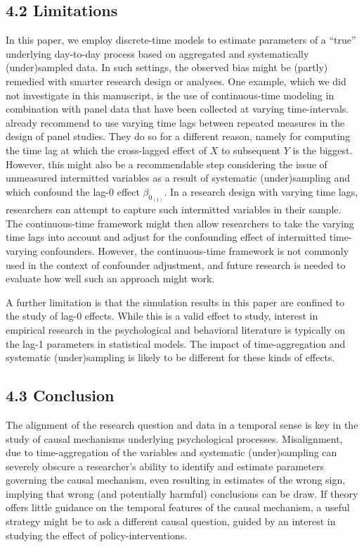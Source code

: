 \documentclass[man]{apa7} %
\begin{document}
\subsection{4.2 Limitations}
In this paper, we employ discrete-time models to estimate parameters of a ``true'' underlying day-to-day process based on aggregated and systematically (under)sampled data. In such settings, the observed bias might be (partly) remedied with smarter research design or analyses. One example, which we did not investigate in this manuscript, is the use of continuous-time modeling in combination with panel data that have been collected at varying time-intervals. \textcite{dormann_optimal_2015} already recommend to use varying time lags between repeated measures in the design of panel studies. They do so for a different reason, namely for computing the time lag at which the cross-lagged effect of $X$ to subsequent $Y$ is the biggest. However, this might also be a recommendable step considering the issue of unmeasured intermitted variables as a result of systematic (under)sampling and which confound the lag-0 effect $\beta_{0_{(1)}}$. In a research design with varying time lags, researchers can attempt to capture such intermitted variables in their sample. The continuous-time framework might then allow researchers to take the varying time lags into account and adjust for the confounding effect of intermitted time-varying confounders. However, the continuous-time framework is not commonly used in the context of confounder adjustment, and future research is needed to evaluate how well such an approach might work. 

A further limitation is that the simulation results in this paper are confined to the study of lag-0 effects. While this is a valid effect to study, interest in empirical research in the psychological and behavioral literature is typically on the lag-1 parameters in statistical models. The impact of time-aggregation and systematic (under)sampling is likely to be different for these kinds of effects. 

\subsection{4.3 Conclusion}
The alignment of the research question and data in a temporal sense is key in the study of causal mechanisms underlying psychological processes. Misalignment, due to time-aggregation of the variables and systematic (under)sampling can severely obscure a researcher's ability to identify and estimate parameters governing the causal mechanism, even resulting in estimates of the wrong sign, implying that wrong (and potentially harmful) conclusions can be draw. If theory offers little guidance on the temporal features of the causal mechanism, a useful strategy might be to ask a different causal question, guided by an interest in studying the effect of policy-interventions.
\end{document}

